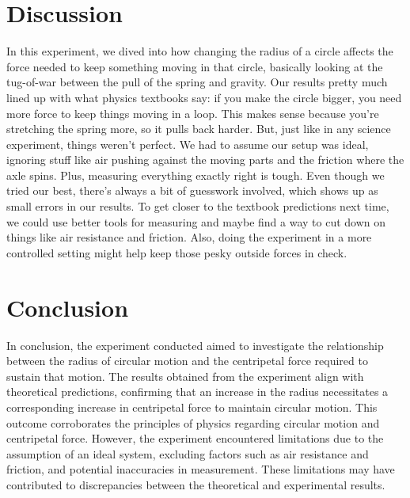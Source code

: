 \documentclass{report}
\begin{document}
    \bigbreak \noindent 
    \section{Discussion}
    \bigbreak \noindent 
    In this experiment, we dived into how changing the radius of a circle affects the force needed to keep something moving in that circle, basically looking at the tug-of-war between the pull of the spring and gravity. Our results pretty much lined up with what physics textbooks say: if you make the circle bigger, you need more force to keep things moving in a loop. This makes sense because you're stretching the spring more, so it pulls back harder.
    \bigbreak \noindent 
    But, just like in any science experiment, things weren't perfect. We had to assume our setup was ideal, ignoring stuff like air pushing against the moving parts and the friction where the axle spins. Plus, measuring everything exactly right is tough. Even though we tried our best, there's always a bit of guesswork involved, which shows up as small errors in our results.
    \bigbreak \noindent 
    To get closer to the textbook predictions next time, we could use better tools for measuring and maybe find a way to cut down on things like air resistance and friction. Also, doing the experiment in a more controlled setting might help keep those pesky outside forces in check.
    \bigbreak \noindent 

    \section{Conclusion}
    \bigbreak \noindent 
    In conclusion, the experiment conducted aimed to investigate the relationship between the radius of circular motion and the centripetal force required to sustain that motion. The results obtained from the experiment align with theoretical predictions, confirming that an increase in the radius necessitates a corresponding increase in centripetal force to maintain circular motion. This outcome corroborates the principles of physics regarding circular motion and centripetal force.
    \bigbreak \noindent 
    However, the experiment encountered limitations due to the assumption of an ideal system, excluding factors such as air resistance and friction, and potential inaccuracies in measurement. These limitations may have contributed to discrepancies between the theoretical and experimental results.










    
\end{document}
